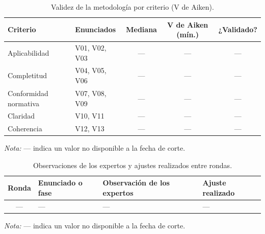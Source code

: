 \begin{table}[htbp]
  \centering
  \caption{Validez de la metodología por criterio (V de Aiken).}
  \label{tab:juicio_expertos}
  \footnotesize
  \renewcommand{\arraystretch}{1.2}
  \begin{tabular}{|l|l|c|c|c|}
    \hline
    \textbf{Criterio} & \textbf{Enunciados} & \textbf{Mediana} & \textbf{V de Aiken (mín.)} & \textbf{¿Validado?} \\
    \hline
    Aplicabilidad & V01, V02, V03 & --- & --- & --- \\ \hline
    Completitud & V04, V05, V06 & --- & --- & --- \\ \hline
    Conformidad normativa & V07, V08, V09 & --- & --- & --- \\ \hline
    Claridad & V10, V11 & --- & --- & --- \\ \hline
    Coherencia & V12, V13 & --- & --- & --- \\ \hline
  \end{tabular}
  \par\vspace{2pt}
  \raggedright
  \textit{Nota:} --- indica un valor no disponible a la fecha de corte.
  \par\vspace{2pt}
\end{table}

\begin{table}[htbp]
  \centering
  \caption{Observaciones de los expertos y ajustes realizados entre rondas.}
  \label{tab:ajustes_delphi}
  \footnotesize
  \renewcommand{\arraystretch}{1.2}
  \begin{tabularx}{\textwidth}{|c|>{\raggedright\arraybackslash}p{2.2cm}|L|L|}
    \hline
    \textbf{Ronda} & \textbf{Enunciado o fase} & \textbf{Observación de los expertos} & \textbf{Ajuste realizado} \\
    \hline
    --- & --- & --- & --- \\ \hline
  \end{tabularx}
  \par\vspace{2pt}
  \raggedright
  \textit{Nota:} --- indica un valor no disponible a la fecha de corte.
  \par\vspace{2pt}
\end{table}

